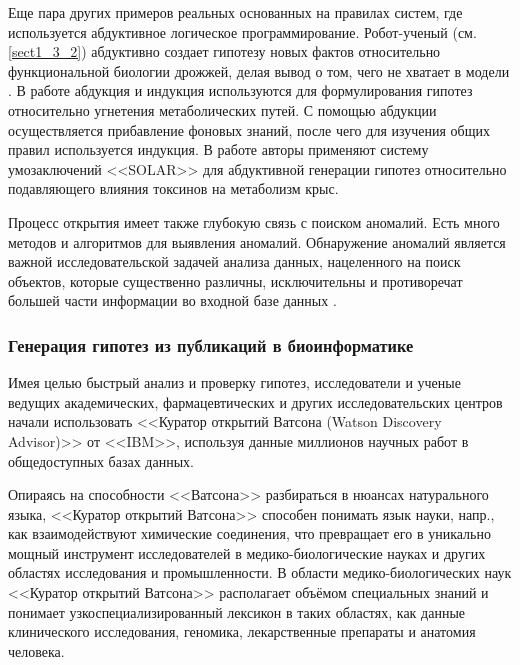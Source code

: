 Еще пара других примеров реальных основанных на правилах систем, где используется абдуктивное логическое 
программирование. Робот-ученый (см. \cref{sect1_3_2}) абдуктивно создает гипотезу новых фактов относительно 
функциональной биологии дрожжей, делая вывод о том, чего не хватает в модели \cite{King2011}. В работе 
\cite{TamaddoniNezhad2006} абдукция и индукция используются для формулирования гипотез относительно угнетения 
метаболических путей. С помощью абдукции осуществляется прибавление фоновых знаний, после чего для изучения общих 
правил используется индукция. В работе \cite{Inoue2009} авторы применяют систему умозаключений <<SOLAR>> для 
абдуктивной генерации гипотез относительно подавляющего влияния токсинов на метаболизм крыс.

Процесс открытия имеет также глубокую связь с поиском аномалий. Есть много методов и алгоритмов для выявления аномалий. 
Обнаружение аномалий является важной исследовательской задачей анализа данных, нацеленного на поиск объектов, которые 
существенно различны, исключительны и противоречат большей части информации во входной базе данных \cite{Bartha2013}.


\subsubsection{Генерация гипотез из публикаций в биоинформатике}\label{sect1_2_5_3}
Имея целью быстрый анализ и проверку гипотез, исследователи и ученые ведущих академических, фармацевтических и 
других исследовательских центров начали использовать <<Куратор открытий Ватсона (Watson Discovery Advisor)>> от <<IBM>>, 
используя данные миллионов научных работ в общедоступных базах данных. 

Опираясь на способности <<Ватсона>> разбираться в нюансах натурального языка, <<Куратор открытий Ватсона>> способен 
понимать язык науки, напр., как взаимодействуют химические соединения, что превращает его в уникально мощный инструмент 
исследователей в медико-биологические науках и других областях исследования и промышленности. В области 
медико-биологических наук <<Куратор открытий Ватсона>> располагает объёмом специальных знаний и понимает 
узкоспециализированный лексикон в таких областях, как данные клинического исследования, геномика, лекарственные 
препараты и анатомия человека.

